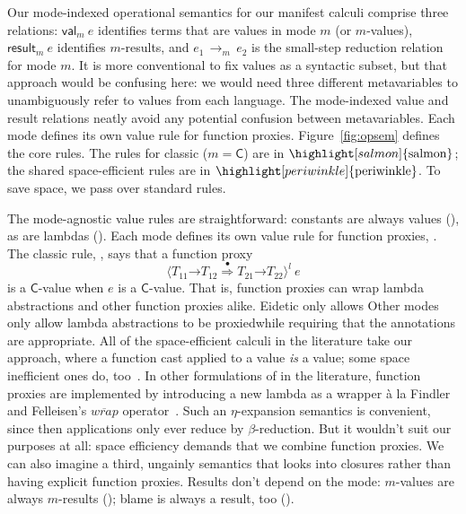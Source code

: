 \documentclass[9pt]{extarticle}
\newcommand{\ottnt}[1]{\mathit{#1}}
\newcommand{\ottsym}[1]{#1}
\begin{document}
Our mode-indexed operational semantics for our manifest calculi
comprise three relations: $ \mathsf{val} _{ \ottnt{m} }~ \ottnt{e} $ identifies terms that are
values in mode $\ottnt{m}$ (or $\ottnt{m}$-values), $ \mathsf{result} _{ \ottnt{m} }~ \ottnt{e} $
identifies $\ottnt{m}$-results, and $\ottnt{e_{{\mathrm{1}}}} \,  \longrightarrow _{ \ottnt{m} }  \, \ottnt{e_{{\mathrm{2}}}}$ is the small-step
reduction relation for mode $\ottnt{m}$.
{\iffull
It is more conventional to fix values as a syntactic subset, but that
approach would be confusing here: we would need three different
metavariables to unambiguously refer to values from each language. The
mode-indexed value and result relations neatly avoid any potential
confusion between metavariables.
Each mode defines its own value rule for function
proxies. 
\fi}
Figure~\ref{fig:opsem} defines the core rules. The
rules for classic \lambdah ($\ottnt{m}  \ottsym{=}   \mathsf{C} $) are in
$\highlight[salmon]{\text{salmon}}$; the shared space-efficient
rules are in $\highlight[periwinkle]{\text{periwinkle}}$.
To save space, we pass over standard rules.

The mode-agnostic value rules are straightforward: constants are
always values (), as are lambdas (). Each mode defines
its own value rule for function proxies, \V{Proxy$\ottnt{m}$}. The classic
rule, , says that a function proxy  \[  \langle   \ottnt{T_{{\mathrm{11}}}} \mathord{ \rightarrow } \ottnt{T_{{\mathrm{12}}}}   \mathord{ \overset{ \bullet }{\Rightarrow} }   \ottnt{T_{{\mathrm{21}}}} \mathord{ \rightarrow } \ottnt{T_{{\mathrm{22}}}}   \rangle^{ \ottnt{l} } ~  \ottnt{e}  \] is a $ \mathsf{C} $-value when $\ottnt{e}$ is a
$ \mathsf{C} $-value. That is, function proxies can wrap lambda abstractions
and other function proxies alike.
\ifpopl Eidetic \lambdah only allows \else Other modes only allow \fi
lambda abstractions to be proxied\iffull while requiring that the
annotations are appropriate\fi.
All of the space-efficient calculi in the literature take our
approach, where a function cast applied to a value \textit{is} a
value; some space inefficient ones do,
too~\cite{Findler02contracts,Gronski07unifying,Greenberg12contracts}.
In other formulations of \lambdah in the literature, function proxies
are implemented by introducing a new lambda as a wrapper \`a la
Findler and Felleisen's $\overline{wrap}$
operator~\cite{Findler02contracts,Flanagan06hybrid,Siek06gradual,Belo11fh}. Such
an $\eta$-expansion semantics is convenient, since then applications
only ever reduce by $\beta$-reduction. But it wouldn't suit our
purposes at all: space efficiency demands that we combine function
proxies.
We can also imagine a third, ungainly semantics that looks into closures rather
than having explicit function proxies.
Results don't depend on the mode: $\ottnt{m}$-values are
always $\ottnt{m}$-results (); blame is always a result, too
().
\end{document}
